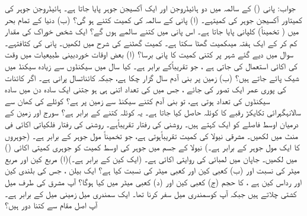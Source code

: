 جواب: 
پانی ()    کے سالمہ میں دو ہائیڈروجن اور ایک آکسیجن   جوہر پایا جاتا ہے۔ ہائیڈروجن جوہر کی کمیتاور آکسیجن جوہر کی کمیتہے۔  (ا) پانی کے سالمہ کی کمیت کتنے ہو گی؟  (ب) دنیا کے  تمام بحر میں ( تخمیناً)  کلپانی پایا جاتا ہے۔ اس پانی میں کتنے سالمے  ہوں گے؟ 
ایک شخص خوراک کی مقدار کم کر کے ایک ہفتہ میںکمیت گھٹا سکتا ہے۔ کمیت گھٹنے کی شرح میں لکھیں۔ 
پانی کی کثافتہے۔ سوال   میں دیے گئے شہر پر کتنی  کمیت کا پانی برسا؟ 
(ا)  بعض اوقات خوردبینی  طبیعیات میں وقت کی اکائی  استعمال کی جاتی ہے ، جو  تقریباًکے برابر ہے۔ کیا  سال میں سیکنڈوں سے زیادہ سیکنڈ میں شیک پائے جاتے ہیں؟  (ب)  زمین پر بنی آدم سال گزار چکا ہے، جبکہ کائناتسال پرانی ہے۔ اگر کائنات کی پوری عمر  ایک  تصور کی جائے ، جس میں  کی تعداد اتنی ہی ہو جتنی  ایک سادہ دن میں سادہ سیکنڈوں کی تعداد ہوتی ہے، تو بنی آدم  کتنے سیکنڈ سے زمین پر  ہے؟ 
کوئلے کی   کھان سے سالانہگہرائی تکایکڑ رقبے کا کوئلہ حاصل کیا جاتا ہے۔ یہ کوئلہ 
کتنے کے برابر ہے؟ 
سورج اور زمین کے درمیان اوسط فاصلے  کو ایک  کہتے ہیں۔ روشنی کی رفتار تقریباًہے۔ روشنی کی رفتار  فلکیاتی اکائی فی منٹ  میں لکھیں۔ 
  مشرقی نیولا کی کمیت تقریباًہوتی ہے، جو تخمیناً مول جوہر کے برابر ہے۔ (جوہروں کا ایک مول جوہر  کے برابر ہے۔)  نیولا کے  جسم میں  جوہر کی اوسط کمیت کو جوہری کمیتی اکائی ()  میں لکھیں۔ 
جاپان میں لمبائی کی روایتی اکائی   ہے۔ (ایک کین  کے برابر ہے۔)(ا)  مربع کین اور مربع میٹر  کی نسبت اور  (ب) کعبی کین اور کعبی میٹر کی  نسبت کیا ہے؟ ایک بیلن ، جس کی بلندی کین  اور رداس کین ہے ، کا حجم  (ج)  کعبی کین اور   (د)   کعبی  میٹر میں  کیا  ہوگا؟ 
آپ مشرق کی طرف میل کشتی  چلاتے ہیں  جبکہ آپ کوسمندری میل سفر کرنا تھا۔ ایک سمندری  میل   زمینی میل کے برابر ہے۔ آپ اصل مقام سے کتنا دور ہیں؟

